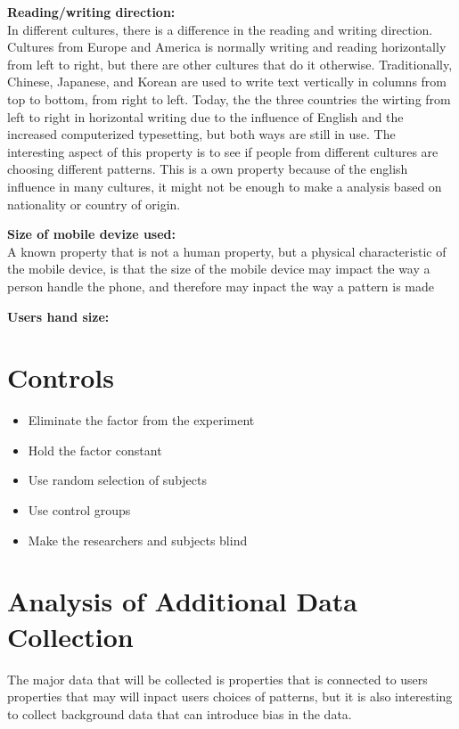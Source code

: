     {\bf Reading/writing direction:} \\
    In different cultures, there is a difference in the reading and writing direction. Cultures from Europe and America is normally writing and reading horizontally from left to right, but there are other cultures that do it otherwise. Traditionally, Chinese, Japanese, and Korean are used to write text vertically in columns from top to bottom, from right to left. Today, the the three countries the wirting from left to right in horizontal writing due to the influence of English and the increased computerized typesetting, but both ways are still in use. The interesting aspect of this property is to see if people from different cultures are choosing different patterns. This is a own property because of the english influence in many cultures, it might not be enough to make a analysis based on nationality or country of origin. 

    {\bf Size of mobile devize used:} \\
    A known property that is not a human property, but a physical characteristic of the mobile device, is that the size of the mobile device may impact the way a person handle the phone, and therefore may inpact the way a pattern is made

    {\bf Users hand size:} 


  \section{Controls}

    \begin{itemize}
      \item Eliminate the factor from the experiment
      \item Hold the factor constant
      \item Use random selection of subjects
      \item Use control groups
      \item Make the researchers and subjects blind
    \end{itemize}

  \section{Analysis of Additional Data Collection}
  The major data that will be collected is properties that is connected to users properties that may will inpact users choices of patterns, but it is also interesting to collect background data that can introduce bias in the data.


